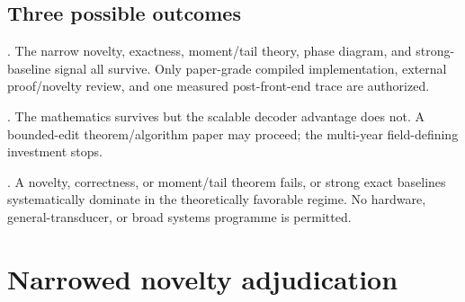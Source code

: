 \documentclass[11pt]{article}
\theoremstyle{definition}
\theoremstyle{remark}
\begin{document}
\subsection{Three possible outcomes}
\begin{description}[leftmargin=2.8em,style=nextline]
\item[CONTINUE]
.  The narrow novelty, exactness, moment/tail theory, phase diagram, and strong-baseline signal all survive.  Only paper-grade compiled implementation, external proof/novelty review, and one measured post-front-end trace are authorized.
\item[NARROW]
.  The mathematics survives but the scalable decoder advantage does not.  A bounded-edit theorem/algorithm paper may proceed; the multi-year field-defining investment stops.
\item[STOP]
.  A novelty, correctness, or moment/tail theorem fails, or strong exact baselines systematically dominate in the theoretically favorable regime.  No hardware, general-transducer, or broad systems programme is permitted.
\end{description}

\section{Narrowed novelty adjudication}
\end{document}
